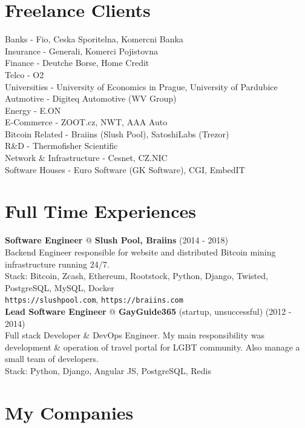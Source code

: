 \documentclass[12pt,a4paper]{article}
\begin{document}
\section*{Freelance Clients}
Banks - Fio, Ceska Sporitelna, Komercni Banka\\
Insurance - Generali, Komerci Pojistovna\\
Finance - Deutche Borse, Home Credit\\
Telco - O2\\
Universities - University of Economics in Prague, University of Pardubice\\
Autmotive - Digiteq Automotive (WV Group)\\
Energy - E.ON\\
E-Commerce - ZOOT.cz, NWT, AAA Auto\\
Bitcoin Related - Braiins (Slush Pool), SatoshiLabs (Trezor)\\
R\&D - Thermofisher Scientific\\
Network \& Infrastructure - Cesnet, CZ.NIC\\
Software Houses - Euro Software (GK Software), CGI, EmbedIT\\

\section*{Full Time Experiences}

{\bf Software Engineer} @ {\bf Slush Pool, Braiins} (2014 - 2018)\\
Backend Engineer responsible for website and distributed Bitcoin mining infrastructure running 24/7.\\
Stack: Bitcoin, Zcash, Ethereum, Rootstock, Python, Django, Twisted, PostgreSQL, MySQL, Docker\\
\texttt{https://slushpool.com}, \texttt{https://braiins.com}\\

{\bf Lead Software Engineer} @ {\bf GayGuide365} (startup, unsuccessful) (2012 - 2014)\\
Full stack Developer \& DevOps Engineer. My main responsibility was development \& operation of travel portal for LGBT community. Also manage a small team of developers.\\
Stack: Python, Django, Angular JS, PostgreSQL, Redis\\

\section*{My Companies}
\end{document}
